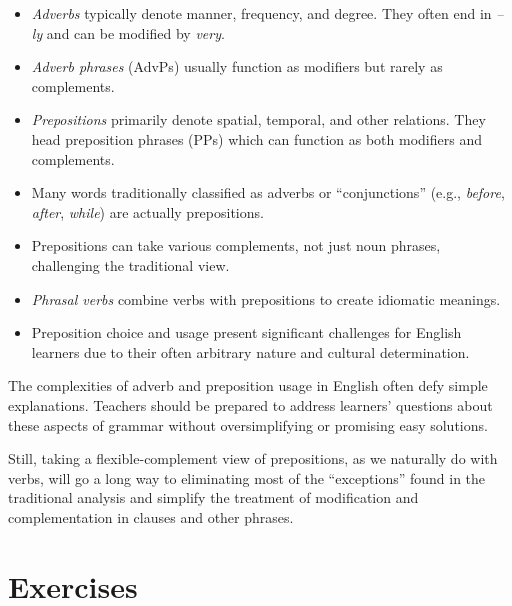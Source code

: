 \begin{itemize}
    \item \textit{Adverbs} typically denote manner, frequency, and degree. They often end in \textit{--ly} and can be modified by \textit{very}.
    \item \textit{Adverb phrases} (AdvPs) usually function as modifiers but rarely as complements.
    \item \textit{Prepositions} primarily denote spatial, temporal, and other relations. They head preposition phrases (PPs) which can function as both modifiers and complements.
    \item Many words traditionally classified as adverbs or ``conjunctions'' (e.g., \textit{before}, \textit{after}, \textit{while}) are actually prepositions.
    \item Prepositions can take various complements, not just noun phrases, challenging the traditional view.
    \item \textit{Phrasal verbs} combine verbs with prepositions to create idiomatic meanings.
    \item Preposition choice and usage present significant challenges for English learners due to their often arbitrary nature and cultural determination.
\end{itemize}

The complexities of adverb and preposition usage in English often defy simple explanations. Teachers should be prepared to address learners' questions about these aspects of grammar without oversimplifying or promising easy solutions.

Still, taking a flexible-complement view of prepositions, as we naturally do with verbs, will go a long way to eliminating most of the ``exceptions'' found in the traditional analysis and simplify the treatment of modification and complementation in clauses and other phrases.

\clearpage            %
\section*{Exercises}  %

